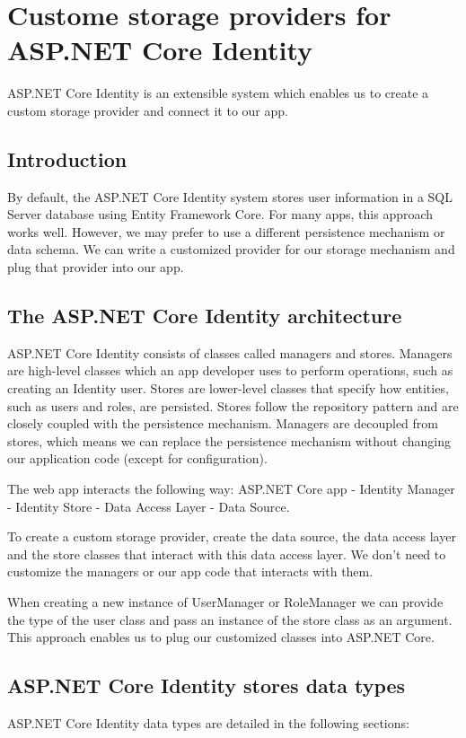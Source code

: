 \documentclass{report}
\begin{document}
    \chapter{Custome storage providers for ASP.NET Core Identity}
    ASP.NET Core Identity is an extensible system which enables us to create a
    custom storage provider and connect it to our app.

    \section{Introduction}
    By default, the ASP.NET Core Identity system stores user information in a SQL
    Server database using Entity Framework Core. For many apps, this approach works
    well. However, we may prefer to use a different persistence mechanism or data schema.
    We can write a customized provider for our storage mechanism and plug that provider
    into our app.

    \section{The ASP.NET Core Identity architecture}
    ASP.NET Core Identity consists of classes called managers and stores. Managers are
    high-level classes which an app developer uses to perform operations,
    such as creating an Identity user. Stores are lower-level classes that specify
    how entities, such as users and roles, are persisted. Stores follow the repository
    pattern and are closely coupled with the persistence mechanism.
    Managers are decoupled from stores, which means we can replace the persistence
    mechanism without changing our application code (except for configuration).

    The web app interacts the following way: ASP.NET Core app - Identity Manager -
    Identity Store - Data Access Layer - Data Source.

    To create a custom storage provider, create the data source, the data access
    layer and the store classes that interact with this data access layer. We don't
    need to customize the managers or our app code that interacts with them.

    When creating a new instance of UserManager or RoleManager we can provide the
    type of the user class and pass an instance of the store class as an argument.
    This approach enables us to plug our customized classes into ASP.NET Core.

    \section{ASP.NET Core Identity stores data types}
    ASP.NET Core Identity data types are detailed in the following
    sections:
\end{document}
